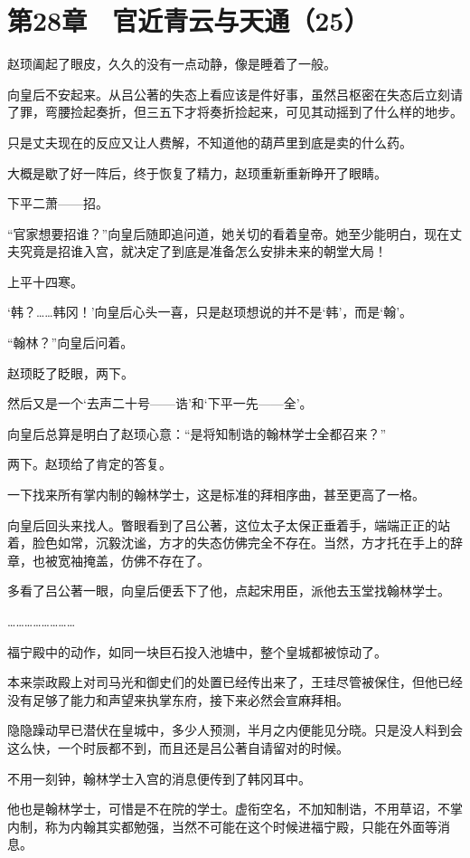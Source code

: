 \section{第28章　官近青云与天通（25）}

赵顼阖起了眼皮，久久的没有一点动静，像是睡着了一般。

向皇后不安起来。从吕公著的失态上看应该是件好事，虽然吕枢密在失态后立刻请了罪，弯腰捡起奏折，但三五下才将奏折捡起来，可见其动摇到了什么样的地步。

只是丈夫现在的反应又让人费解，不知道他的葫芦里到底是卖的什么药。

大概是歇了好一阵后，终于恢复了精力，赵顼重新重新睁开了眼睛。

下平二萧——招。

“官家想要招谁？”向皇后随即追问道，她关切的看着皇帝。她至少能明白，现在丈夫究竟是招谁入宫，就决定了到底是准备怎么安排未来的朝堂大局！

上平十四寒。

‘韩？……韩冈！’向皇后心头一喜，只是赵顼想说的并不是‘韩’，而是‘翰’。

“翰林？”向皇后问着。

赵顼眨了眨眼，两下。

然后又是一个‘去声二十号——诰’和‘下平一先——全’。

向皇后总算是明白了赵顼心意：“是将知制诰的翰林学士全都召来？”

两下。赵顼给了肯定的答复。

一下找来所有掌内制的翰林学士，这是标准的拜相序曲，甚至更高了一格。

向皇后回头来找人。瞥眼看到了吕公著，这位太子太保正垂着手，端端正正的站着，脸色如常，沉毅沈谧，方才的失态仿佛完全不存在。当然，方才托在手上的辞章，也被宽袖掩盖，仿佛不存在了。

多看了吕公著一眼，向皇后便丢下了他，点起宋用臣，派他去玉堂找翰林学士。

……………………

福宁殿中的动作，如同一块巨石投入池塘中，整个皇城都被惊动了。

本来崇政殿上对司马光和御史们的处置已经传出来了，王珪尽管被保住，但他已经没有足够了能力和声望来执掌东府，接下来必然会宣麻拜相。

隐隐躁动早已潜伏在皇城中，多少人预测，半月之内便能见分晓。只是没人料到会这么快，一个时辰都不到，而且还是吕公著自请留对的时候。

不用一刻钟，翰林学士入宫的消息便传到了韩冈耳中。

他也是翰林学士，可惜是不在院的学士。虚衔空名，不加知制诰，不用草诏，不掌内制，称为内翰其实都勉强，当然不可能在这个时候进福宁殿，只能在外面等消息。

